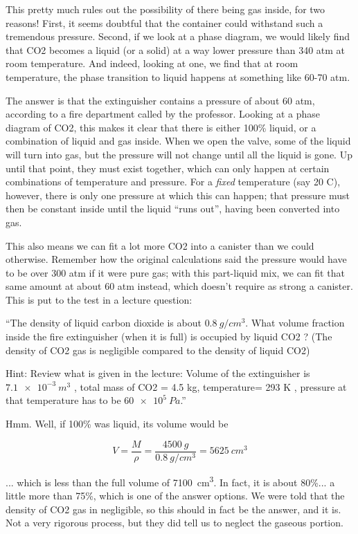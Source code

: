 This pretty much rules out the possibility of there being gas inside, for two reasons! First, it seems doubtful that the container could withstand such a tremendous pressure. Second, if we look at a phase diagram, we would likely find that CO2 becomes a liquid (or a solid) at a way lower pressure than 340 atm at room temperature. And indeed, looking at one, we find that at room temperature, the phase transition to liquid happens at something like 60-70 atm.

The answer is that the extinguisher contains a pressure of about 60 atm, according to a fire department called by the professor. Looking at a phase diagram of CO2, this makes it clear that there is either 100\% liquid, or a combination of liquid and gas inside. When we open the valve, some of the liquid will turn into gas, but the pressure will not change until all the liquid is gone. Up until that point, they must exist together, which can only happen at certain combinations of temperature and pressure. For a \emph{fixed} temperature (say 20 C), however, there is only one pressure at which this can happen; that pressure must then be constant inside until the liquid ``runs out'', having been converted into gas.

This also means we can fit a lot more CO2 into a canister than we could otherwise. Remember how the original calculations said the pressure would have to be over 300 atm if it were pure gas; with this part-liquid mix, we can fit that same amount at about 60 atm instead, which doesn't require as strong a canister. This is put to the test in a lecture question:

``The density of liquid carbon dioxide is about $\SI{0.8}{g/cm^3}$. What volume fraction inside the fire extinguisher (when it is full) is occupied by liquid CO2 ? (The density of CO2 gas is negligible compared to the density of liquid CO2)

Hint: Review what is given in the lecture: Volume of the extinguisher is $\SI{7.1e-3}{m^3}$ , total mass of CO2 = 4.5 kg, temperature= 293 K , pressure at that temperature has to be $\SI{60e5}{Pa}$.''

Hmm. Well, if 100\% was liquid, its volume would be

\begin{equation}
V = \frac{M}{\rho} = \frac{\SI{4500}{g}}{\SI{0.8}{g/cm^3}} = \SI{5625}{cm^3}
\end{equation}

... which is less than the full volume of \SI{7100}{cm^3}. In fact, it is about 80\%... a little more than 75\%, which is one of the answer options. We were told that the density of CO2 gas in negligible, so this should in fact be the answer, and it is. Not a very rigorous process, but they did tell us to neglect the gaseous portion.

